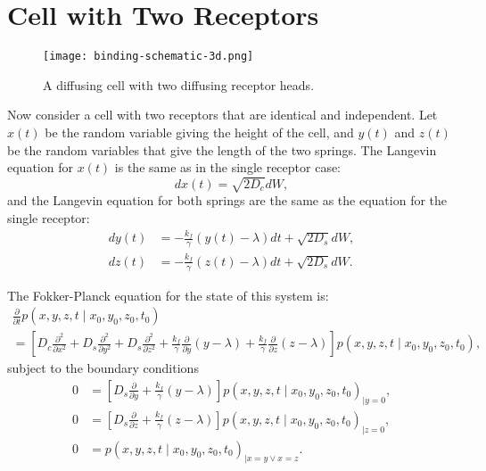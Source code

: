 \documentclass{article}
\newcommand{\stiff}{\frac{k_f}{\gamma}}
\newcommand{\Pder}[2]{\frac{\partial #1}{\partial #2}}
\newcommand{\xdiff}{\frac{\partial^2}{\partial x^2}}
\newcommand{\ydiff}{\frac{\partial^2}{\partial y^2}}
\newcommand{\zdiff}{\frac{\partial^2}{\partial z^2}}
\begin{document}
\section{Cell with Two Receptors}
\label{sec:cell-two-rec}

\begin{figure}
  \centering
  \texttt{[image: binding-schematic-3d.png]}
  \caption{A diffusing cell with two diffusing receptor heads.}
  \label{fig:binding-schematic-2}
\end{figure}

Now consider a cell with two receptors that are identical and
independent. Let $x(t)$ be the random variable giving the height of
the cell, and $y(t)$ and $z(t)$ be the random variables that give the
length of the two springs. The Langevin equation for $x(t)$ is the
same as in the single receptor case:
\begin{equation}
  \label{eq:lang-x-2}
  dx(t) = \sqrt{2D_c}dW,
\end{equation}
and the Langevin equation for both springs are the same as the
equation for the single receptor:
\begin{align}
  \label{eq:lang-y-2}
  dy(t) &= -\stiff (y(t) - \lambda) dt + \sqrt{2D_s} dW, \\
  \label{eq:lang-z-2}
  dz(t) &= -\stiff (z(t) - \lambda) dt + \sqrt{2D_s} dW.
\end{align}

The Fokker-Planck equation for the state of this system is:
\begin{multline}
  \label{eq:fokker-planck-2}
  \Pder{}{t}p(x, y, z, t \mid x_0, y_0, z_0, t_0) \\
  = \left[D_c \xdiff + D_s \ydiff + D_s \zdiff + \stiff \Pder{}{y} (y
    - \lambda) + \stiff \Pder{}{z} (z - \lambda)\right] p(x, y, z, t
  \mid x_0, y_0, z_0, t_0),
\end{multline}
subject to the boundary conditions
\begin{align}
  \label{eq:y-noflux-2}
  0 &= \left[D_s \Pder{}{y} + \stiff (y - \lambda)\right]p(x, y, z, t
      \mid x_0, y_0, z_0, t_0)_{|y = 0}, \\
  \label{eq:z-noflux-2}
  0 &= \left[D_s \Pder{}{z} + \stiff (z - \lambda)\right]p(x, y, z, t
      \mid x_0, y_0, z_0, t_0)_{|z = 0}, \\
  \label{eq:xy-xz--absorb}
  0 &= p(x, y, z, t \mid x_0, y_0, z_0, t_0)_{|x=y \vee x=z}.
\end{align}
\end{document}
